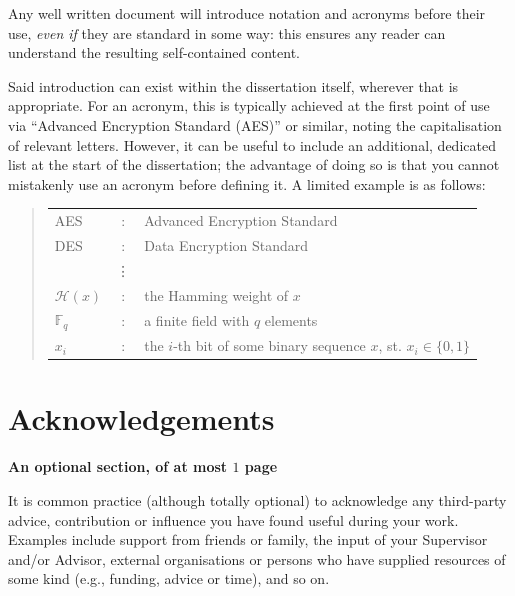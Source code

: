 \documentclass[ %
                    author={Daniel Page},
                supervisor={Dr. Andrew Calway},
                    degree={MSc},
                     title={Some Structural Guidelines for Data Science MSc Theses, Including Those With Long Titles that Run Across Multiple Lines on the Front Page},
                  subtitle={And those including an optional subtitle too, for good measure},
                      type={},
                      year={2021}]{dissertation}
\begin{document}
\noindent
Any well written document will introduce notation and acronyms before
their use, {\em even if} they are standard in some way: this ensures 
any reader can understand the resulting self-contained content.  

Said introduction can exist within the dissertation itself, wherever 
that is appropriate.  For an acronym, this is typically achieved at 
the first point of use via ``Advanced Encryption Standard (AES)'' or 
similar, noting the capitalisation of relevant letters.  However, it 
can be useful to include an additional, dedicated list at the start 
of the dissertation; the advantage of doing so is that you cannot 
mistakenly use an acronym before defining it.  A limited example is 
as follows:

\begin{quote}
\noindent
\begin{tabular}{lcl}
AES                 &:     & Advanced Encryption Standard                                         \\
DES                 &:     & Data Encryption Standard                                             \\
                    &\vdots&                                                                      \\
${\mathcal H}( x )$ &:     & the Hamming weight of $x$                                            \\
${\mathbb  F}_q$    &:     & a finite field with $q$ elements                                     \\
$x_i$               &:     & the $i$-th bit of some binary sequence $x$, st. $x_i \in \{ 0, 1 \}$ \\
\end{tabular}
\end{quote}


\chapter*{Acknowledgements}

{\bf An optional section, of at most $1$ page}
\vspace{1cm} 

\noindent
It is common practice (although totally optional) to acknowledge any
third-party advice, contribution or influence you have found useful
during your work.  Examples include support from friends or family, 
the input of your Supervisor and/or Advisor, external organisations 
or persons who  have supplied resources of some kind (e.g., funding, 
advice or time), and so on.
\end{document}
